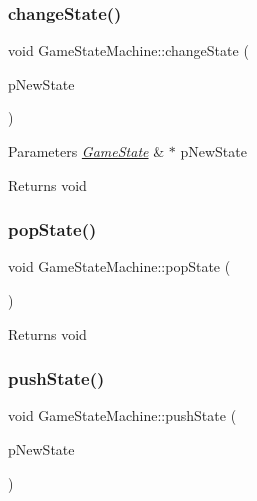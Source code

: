 \subsubsection{\texorpdfstring{changeState()}{changeState()}}
{\footnotesize\ttfamily void Game\+State\+Machine\+::change\+State (\begin{DoxyParamCaption}\item[{\mbox{\hyperlink{class_game_state}{Game\+State}} $\ast$}]{p\+New\+State }\end{DoxyParamCaption})}


\begin{DoxyParams}{Parameters}
{\em \mbox{\hyperlink{class_game_state}{Game\+State}}} & $\ast$ p\+New\+State \\
\hline
\end{DoxyParams}
\begin{DoxyReturn}{Returns}
void 
\end{DoxyReturn}
\mbox{\label{class_game_state_machine_a691905effed30b630c3971fb5bbfcc4f}} 
\subsubsection{\texorpdfstring{popState()}{popState()}}
{\footnotesize\ttfamily void Game\+State\+Machine\+::pop\+State (\begin{DoxyParamCaption}{ }\end{DoxyParamCaption})}

\begin{DoxyReturn}{Returns}
void 
\end{DoxyReturn}
\mbox{\label{class_game_state_machine_ac5c2d4a64d78686af8629baa4e461c54}} 
\subsubsection{\texorpdfstring{pushState()}{pushState()}}
{\footnotesize\ttfamily void Game\+State\+Machine\+::push\+State (\begin{DoxyParamCaption}\item[{\mbox{\hyperlink{class_game_state}{Game\+State}} $\ast$}]{p\+New\+State }\end{DoxyParamCaption})}


